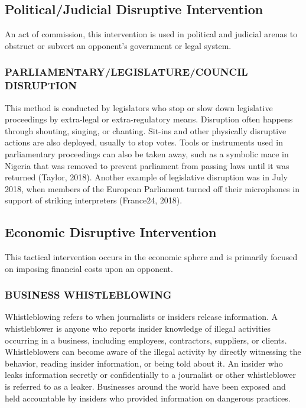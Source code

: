 \documentclass[twoside,a4paper,12pt,fleqn,openany]{extbook}
\begin{document}
\subsection*{Political/Judicial Disruptive Intervention}

An act of commission, this intervention is used in political and judicial arenas to obstruct or subvert an opponent’s government or legal system.

\subsubsection*{PARLIAMENTARY/LEGISLATURE/COUNCIL DISRUPTION}

This method is conducted by legislators who stop or slow down legislative proceedings by extra-legal or extra-regulatory means. Disruption often happens through shouting, singing, or chanting. Sit-ins and other physically disruptive actions are also deployed, usually to stop votes. Tools or instruments used in parliamentary proceedings can also be taken away, such as a symbolic mace in Nigeria that was removed to prevent parliament from passing laws until it was returned (Taylor, 2018). Another example of legislative disruption was in July 2018, when members of the European Parliament turned off their microphones in support of striking interpreters (France24, 2018).

\subsection*{Economic Disruptive Intervention}

This tactical intervention occurs in the economic sphere and is primarily focused on imposing financial costs upon an opponent.

\subsubsection*{BUSINESS WHISTLEBLOWING}

Whistleblowing refers to when journalists or insiders release information. A whistleblower is anyone who reports insider knowledge of illegal activities occurring in a business, including employees, contractors, suppliers, or clients. Whistleblowers can become aware of the illegal activity by directly witnessing the behavior, reading insider information, or being told about it. An insider who leaks information secretly or confidentially to a journalist or other whistleblower is referred to as a leaker. Businesses around the world have been exposed and held accountable by insiders who provided information on dangerous practices.
\end{document}

